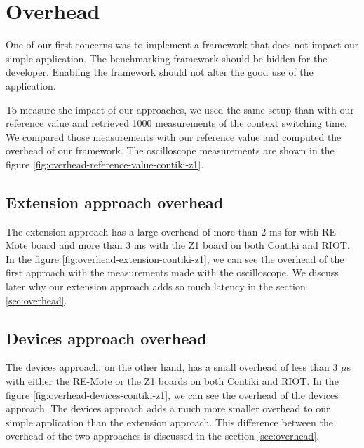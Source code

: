 \section{Overhead}

One of our first concerns was to implement a framework that does not impact our simple application.
The benchmarking framework should be hidden for the developer.
Enabling the framework should not alter the good use of the application.

To measure the impact of our approaches, we used the same setup than with our reference value and retrieved 1000 measurements of the context switching time.
We compared those measurements with our reference value and computed the overhead of our framework.
The oscilloscope measurements are shown in the figure \ref{fig:overhead-reference-value-contiki-z1}.

\subsection{Extension approach overhead}

The extension approach has a large overhead of more than 2 ms for with RE-Mote board and more than 3 ms with the Z1 board on both Contiki and RIOT.
In the figure \ref{fig:overhead-extension-contiki-z1}, we can see the overhead of the first approach with the measurements made with the oscilloscope.
We discuss later why our extension approach adds so much latency in the section \ref{sec:overhead}.

\subsection{Devices approach overhead}

The devices approach, on the other hand, has a small overhead of less than 3 $\mu$s with either the RE-Mote or the Z1 boards on both Contiki and RIOT.
In the figure \ref{fig:overhead-devices-contiki-z1}, we can see the overhead of the devices approach.
The devices approach adds a much more smaller overhead to our simple application than the extension approach.
This difference between the overhead of the two approaches is discussed in the section \ref{sec:overhead}.

